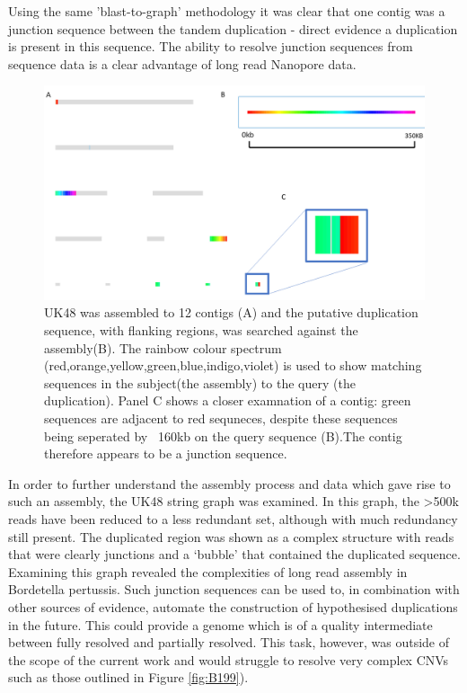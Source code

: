 \documentclass{article}
\begin{document}
Using the same 'blast-to-graph' methodology it was clear that one contig was a junction sequence between the tandem duplication - direct evidence a duplication is present in this sequence. The ability to resolve junction sequences from sequence data is a clear advantage of long read Nanopore data.

\begin{figure}[h!]
\centering
\includegraphics[width=\textwidth{}]{Chapter_1/blast graph 2.png}
\caption{UK48 was assembled to 12 contigs (A) and the putative duplication sequence, with flanking regions, was searched against the assembly(B). The rainbow colour spectrum (red,orange,yellow,green,blue,indigo,violet) is used to show matching sequences in the subject(the assembly) to the query (the duplication). Panel C shows a closer examnation of a contig: green sequences are adjacent to red sequneces, despite these sequences being seperated by ~160kb on the query sequence (B).The contig therefore appears to be a junction sequence.}
\label{fig:Graph_blast_1}
\end{figure}


In order to further understand the assembly process and data which gave rise to such an assembly, the UK48 string graph was examined. In this graph, the >500k reads have been reduced to a less redundant set, although with much redundancy still present. The duplicated region was shown as a complex structure with reads that were clearly junctions and a `bubble' that contained the duplicated sequence. Examining this graph revealed the complexities of long read assembly in Bordetella pertussis. Such junction sequences can be used to, in combination with other sources of evidence, automate the construction of hypothesised duplications in the future. This could provide a genome which is of a quality intermediate between fully resolved and partially resolved. This task, however, was outside of the scope of the current work and would struggle to resolve very complex CNVs such as those outlined in Figure \ref{fig:B199}).
\end{document}
